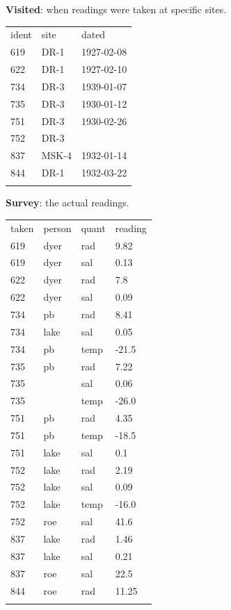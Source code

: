 \documentclass{book}
\begin{document}
\textbf{Visited}: when readings were taken at specific sites.

\begin{tabular}{@{}lll@{}}
\hline\noalign{\medskip}
ident & site & dated
\\\noalign{\medskip}
\hline\noalign{\medskip}
619 & DR-1 & 1927-02-08
\\\noalign{\medskip}
622 & DR-1 & 1927-02-10
\\\noalign{\medskip}
734 & DR-3 & 1939-01-07
\\\noalign{\medskip}
735 & DR-3 & 1930-01-12
\\\noalign{\medskip}
751 & DR-3 & 1930-02-26
\\\noalign{\medskip}
752 & DR-3 & ~
\\\noalign{\medskip}
837 & MSK-4 & 1932-01-14
\\\noalign{\medskip}
844 & DR-1 & 1932-03-22
\\\noalign{\medskip}
\hline
\end{tabular}

\textbf{Survey}: the actual readings.

\begin{tabular}{@{}llll@{}}
\hline\noalign{\medskip}
taken & person & quant & reading
\\\noalign{\medskip}
\hline\noalign{\medskip}
619 & dyer & rad & 9.82
\\\noalign{\medskip}
619 & dyer & sal & 0.13
\\\noalign{\medskip}
622 & dyer & rad & 7.8
\\\noalign{\medskip}
622 & dyer & sal & 0.09
\\\noalign{\medskip}
734 & pb & rad & 8.41
\\\noalign{\medskip}
734 & lake & sal & 0.05
\\\noalign{\medskip}
734 & pb & temp & -21.5
\\\noalign{\medskip}
735 & pb & rad & 7.22
\\\noalign{\medskip}
735 & ~ & sal & 0.06
\\\noalign{\medskip}
735 & ~ & temp & -26.0
\\\noalign{\medskip}
751 & pb & rad & 4.35
\\\noalign{\medskip}
751 & pb & temp & -18.5
\\\noalign{\medskip}
751 & lake & sal & 0.1
\\\noalign{\medskip}
752 & lake & rad & 2.19
\\\noalign{\medskip}
752 & lake & sal & 0.09
\\\noalign{\medskip}
752 & lake & temp & -16.0
\\\noalign{\medskip}
752 & roe & sal & 41.6
\\\noalign{\medskip}
837 & lake & rad & 1.46
\\\noalign{\medskip}
837 & lake & sal & 0.21
\\\noalign{\medskip}
837 & roe & sal & 22.5
\\\noalign{\medskip}
844 & roe & rad & 11.25
\\\noalign{\medskip}
\hline
\end{tabular}
\end{document}
